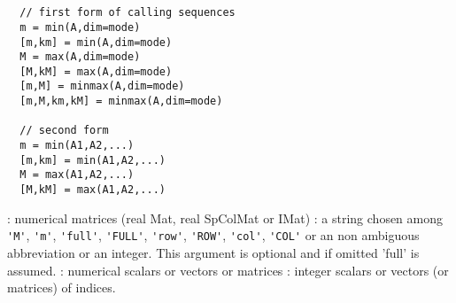 \begin{mandesc}
  \\ 
  \\ 
\end{mandesc}
\begin{calling_sequence}
\begin{verbatim}
  // first form of calling sequences
  m = min(A,dim=mode)
  [m,km] = min(A,dim=mode)
  M = max(A,dim=mode)
  [M,kM] = max(A,dim=mode)
  [m,M] = minmax(A,dim=mode)
  [m,M,km,kM] = minmax(A,dim=mode)

  // second form
  m = min(A1,A2,...)  
  [m,km] = min(A1,A2,...) 
  M = max(A1,A2,...)  
  [M,kM] = max(A1,A2,...)  
\end{verbatim}
\end{calling_sequence}
\begin{parameters}
  \begin{varlist}
    : numerical matrices (real Mat, real SpColMat or IMat)
    : a string chosen among \verb+'M'+, \verb+'m'+, \verb+'full'+, \verb+'FULL'+, \verb+'row'+,
    \verb+'ROW'+, \verb+'col'+, \verb+'COL'+ or an non ambiguous abbreviation or an integer. 
    This argument is optional and if omitted 'full' is assumed.
    : numerical scalars or vectors or matrices
    : integer scalars or vectors (or matrices) of indices.
  \end{varlist}
\end{parameters}

